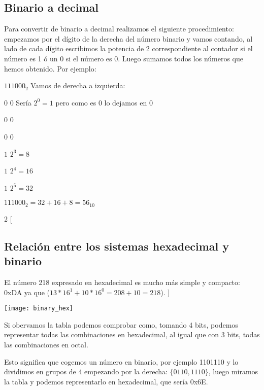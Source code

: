\documentclass{article}
\begin{document}
\subsection{Binario a decimal}
Para convertir de binario a decimal realizamos el siguiente procedimiento: empezamos por el dígito de la derecha del número binario y vamos contando, al lado de cada dígito escribimos la potencia de 2 correspondiente al contador si el número es 1 ó un 0 si el número es 0. Luego sumamos todos los números que hemos obtenido. Por ejemplo:

$111000_2$ \hspace{1cm} Vamos de derecha a izquierda:

$0$ \hspace{1cm} $0$ \hspace{1cm} Sería $2^0 = 1$ pero como es $0$ lo dejamos en $0$

$0$ \hspace{1cm} $0$

$0$ \hspace{1cm} $0$

$1$ \hspace{1cm} $2^3=8$

$1$ \hspace{1cm} $2^4=16$

$1$ \hspace{1cm} $2^5=32$

$111000_2 = 32 + 16 + 8 = 56_{10}$


\thispagestyle{empty}  %

\begin{multicols}{2}
[
\subsection{Relación entre los sistemas hexadecimal y binario}
El número 218 expresado en hexadecimal es mucho más simple y compacto: 0xDA ya que ($13*16^1 + 10*16^0 = 208 + 10 = 218$).
]

\texttt{[image: binary\_hex]}


Si obervamos la tabla podemos comprobar como, tomando 4 bits, podemos representar todas las combinaciones en hexadecimal, al igual que con 3 bits, todas las combinaciones en octal.

Esto significa que cogemos un número en binario, por ejemplo 1101110 y lo dividimos en grupos de 4 empezando por la derecha: $\{0110, 1110\}$, luego miramos la tabla y podemos representarlo en hexadecimal, que sería 0x6E.

\end{multicols}
\end{document}
